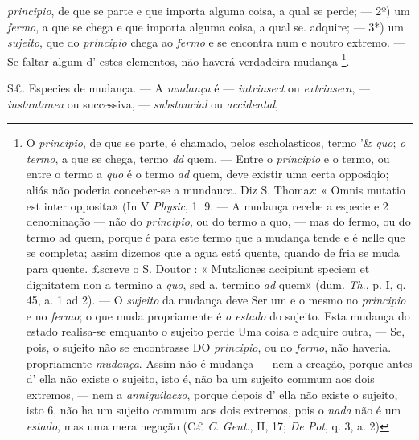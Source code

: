  \emph{principio}, de que se parte e que importa alguma coisa, a qual se perde; --- 2º) um \emph{fermo}, a que se chega e que importa alguma coisa, a qual se. adquire; --- 3*) um \emph{sujeito}, que do \emph{principio} chega ao \emph{fermo} e se encontra num e noutro extremo. --- Se faltar algum d' estes elementos, não haverá verdadeira mudança \footnote{O \emph{principio}, de que se parte, é chamado, pelos escholasticos, termo '\& \emph{quo}; \emph{o termo}, a que se chega, termo \emph{dd} quem. --- Entre o \emph{principio} e o termo, ou entre o termo a \emph{quo} é o termo \emph{ad} quem, deve existir uma certa opposiqio; aliás não poderia conceber-se a mundauca. Diz S. Thomaz: « Omnis mutatio est inter opposita» (In V \emph{Physic}, 1. 9. --- A mudança recebe a especie e 2 denominação --- não do \emph{principio}, ou do termo a quo, --- mas do fermo, ou do termo ad quem, porque é para este termo que a mudança tende e é nelle que se completa; assim dizemos que a agua está quente, quando de fria se muda para quente. £screve o S. Doutor : « Mutaliones accipiunt speciem et dignitatem non a termino a \emph{quo}, sed a. termino \emph{ad} quem» (dum. \emph{Th}., p. I, q. 45, a. 1 ad 2). --- O \emph{sujeito} da mudança deve Ser um e o mesmo no \emph{principio} e no \emph{fermo}; o que muda propriamente é \emph{o estado} do sujeito. Esta mudança do estado realisa-se emquanto o sujeito perde Uma coisa e adquire outra, --- Se, pois, o sujeito não se encontrasse DO \emph{principio}, ou no \emph{fermo}, não haveria. propriamente \emph{mudança}. Assim não é mudança --- nem a creação, porque antes d' ella não existe o sujeito, isto é, não ba um sujeito commum aos dois extremos, --- nem a \emph{anniguilaczo}, porque depois d' ella não existe o sujeito, isto 6, não ha um sujeito commum aos dois extremos, pois o \emph{nada} não é um \emph{estado}, mas uma mera negação (C£ \emph{C}. \emph{Gent}., II, 17; \emph{De Pot}, q. 3, a. 2)}.

S£. Especies de mudança. --- A \emph{mudança} é --- \emph{intrinsect} ou \emph{extrinseca}, --- \emph{instantanea} ou successiva, --- \emph{substancial} ou \emph{accidental},

